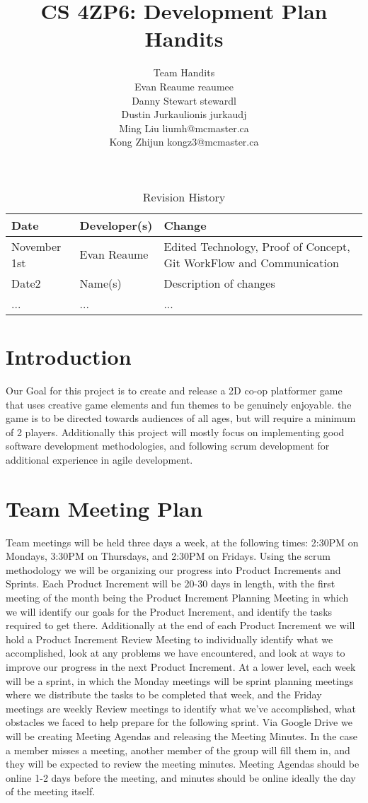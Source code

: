 \documentclass{article}
\title{CS 4ZP6: Development Plan \\Handits}
\author{Team Handits
		\\ Evan Reaume reaumee
		\\ Danny Stewart stewardl
		\\ Dustin Jurkaulionis jurkaudj
		\\ Ming Liu liumh@mcmaster.ca
		\\Kong Zhijun kongz3@mcmaster.ca
}
\date{}
\begin{document}
\begin{table}[hp]
\caption{Revision History} \label{TblRevisionHistory}
\begin{tabularx}{\textwidth}{llX}
\toprule
\textbf{Date} & \textbf{Developer(s)} & \textbf{Change}\\
\midrule
November 1st & Evan Reaume & Edited Technology, Proof of Concept, Git WorkFlow and Communication\\
Date2 & Name(s) & Description of changes\\
... & ... & ...\\
\bottomrule
\end{tabularx}
\end{table}

\newpage

\maketitle

\section{Introduction}
Our Goal for this project is to create and release a 2D co-op platformer game that uses creative game elements and fun themes to be genuinely enjoyable. the game is to be directed towards audiences of all ages, but will require a minimum of 2 players. Additionally this project will mostly focus on implementing good software development methodologies, and following scrum development for additional experience in agile development.

\section{Team Meeting Plan}
Team meetings will be held three days a week, at the following times: 2:30PM on Mondays, 3:30PM on Thursdays, and 2:30PM on Fridays. Using the scrum methodology we will be organizing our progress into Product Increments and Sprints. Each Product Increment will be 20-30 days in length, with the first meeting of the month being the Product Increment Planning Meeting in which we will identify our goals for the Product Increment, and identify the tasks required to get there. Additionally at the end of each Product Increment we will hold a Product Increment Review Meeting to individually identify what we accomplished, look at any problems we have encountered, and look at ways to improve our progress in the next Product Increment. At a lower level, each week will be a sprint, in which the Monday meetings will be sprint planning meetings where we distribute the tasks to be completed that week, and the Friday meetings are weekly Review meetings to identify what we've accomplished, what obstacles we faced to help prepare for the following sprint. Via Google Drive we will be creating Meeting Agendas and releasing the Meeting Minutes. In the case a member misses a meeting, another member of the group will fill them in, and they will be expected to review the meeting minutes. Meeting Agendas should be online 1-2 days before the meeting, and minutes should be online ideally the day of the meeting itself. 
\end{document}

